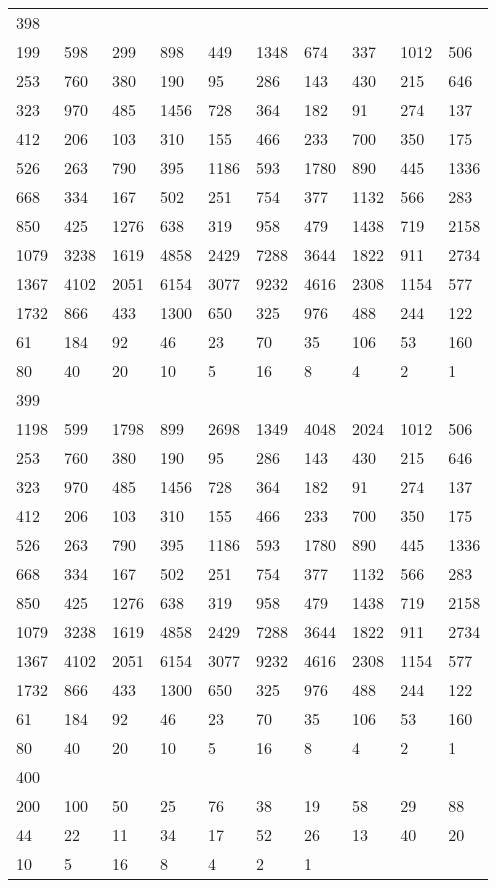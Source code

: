 \begin{longtable}{*{10}{l}}
398&&&&&&&&&\\
199& 598& 299& 898& 449& 1348& 674& 337& 1012& 506\\
253& 760& 380& 190& 95& 286& 143& 430& 215& 646\\
323& 970& 485& 1456& 728& 364& 182& 91& 274& 137\\
412& 206& 103& 310& 155& 466& 233& 700& 350& 175\\
526& 263& 790& 395& 1186& 593& 1780& 890& 445& 1336\\
668& 334& 167& 502& 251& 754& 377& 1132& 566& 283\\
850& 425& 1276& 638& 319& 958& 479& 1438& 719& 2158\\
1079& 3238& 1619& 4858& 2429& 7288& 3644& 1822& 911& 2734\\
1367& 4102& 2051& 6154& 3077& 9232& 4616& 2308& 1154& 577\\
1732& 866& 433& 1300& 650& 325& 976& 488& 244& 122\\
61& 184& 92& 46& 23& 70& 35& 106& 53& 160\\
80& 40& 20& 10& 5& 16& 8& 4& 2& 1\\

399&&&&&&&&&\\
1198& 599& 1798& 899& 2698& 1349& 4048& 2024& 1012& 506\\
253& 760& 380& 190& 95& 286& 143& 430& 215& 646\\
323& 970& 485& 1456& 728& 364& 182& 91& 274& 137\\
412& 206& 103& 310& 155& 466& 233& 700& 350& 175\\
526& 263& 790& 395& 1186& 593& 1780& 890& 445& 1336\\
668& 334& 167& 502& 251& 754& 377& 1132& 566& 283\\
850& 425& 1276& 638& 319& 958& 479& 1438& 719& 2158\\
1079& 3238& 1619& 4858& 2429& 7288& 3644& 1822& 911& 2734\\
1367& 4102& 2051& 6154& 3077& 9232& 4616& 2308& 1154& 577\\
1732& 866& 433& 1300& 650& 325& 976& 488& 244& 122\\
61& 184& 92& 46& 23& 70& 35& 106& 53& 160\\
80& 40& 20& 10& 5& 16& 8& 4& 2& 1\\

400&&&&&&&&&\\
200& 100& 50& 25& 76& 38& 19& 58& 29& 88\\
44& 22& 11& 34& 17& 52& 26& 13& 40& 20\\
10& 5& 16& 8& 4& 2& 1& \\


\end{longtable}
